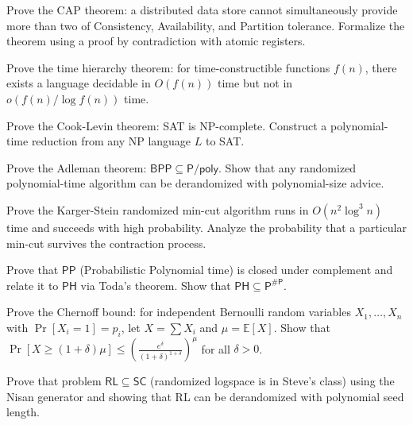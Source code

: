 \documentclass[12pt,a4paper]{exam}
\begin{document}
\begin{questions}

\question[2]
Prove the CAP theorem: a distributed data store cannot simultaneously provide more than two of Consistency, Availability, and Partition tolerance. Formalize the theorem using a proof by contradiction with atomic registers.

\vspace{0.3cm}

\question[6]
Prove the time hierarchy theorem: for time-constructible functions $f(n)$, there exists a language decidable in $O(f(n))$ time but not in $o(f(n)/\log f(n))$ time.

\vspace{0.3cm}

\question[3]
Prove the Cook-Levin theorem: SAT is NP-complete. Construct a polynomial-time reduction from any NP language $L$ to SAT.

\vspace{0.3cm}

\question[7]
Prove the Adleman theorem: $\mathsf{BPP} \subseteq \mathsf{P}/\mathsf{poly}$. Show that any randomized polynomial-time algorithm can be derandomized with polynomial-size advice.

\vspace{0.3cm}

\question[3]
Prove the Karger-Stein randomized min-cut algorithm runs in $O(n^2 \log^3 n)$ time and succeeds with high probability. Analyze the probability that a particular min-cut survives the contraction process.

\vspace{0.3cm}

\question[3]
Prove that $\mathsf{PP}$ (Probabilistic Polynomial time) is closed under complement and relate it to $\mathsf{PH}$ via Toda's theorem. Show that $\mathsf{PH} \subseteq \mathsf{P}^{\#\mathsf{P}}$.

\vspace{0.3cm}

\question[2]
Prove the Chernoff bound: for independent Bernoulli random variables $X_1,\ldots,X_n$ with $\Pr[X_i = 1] = p_i$, let $X = \sum X_i$ and $\mu = \mathbb{E}[X]$. Show that $\Pr[X \geq (1+\delta)\mu] \leq (\frac{e^\delta}{(1+\delta)^{1+\delta}})^\mu$ for all $\delta > 0$.

\vspace{0.3cm}

\question[4]
Prove that problem $\mathsf{RL} \subseteq \mathsf{SC}$ (randomized logspace is in Steve's class) using the Nisan generator and showing that RL can be derandomized with polynomial seed length.


\end{questions}
\end{document}
